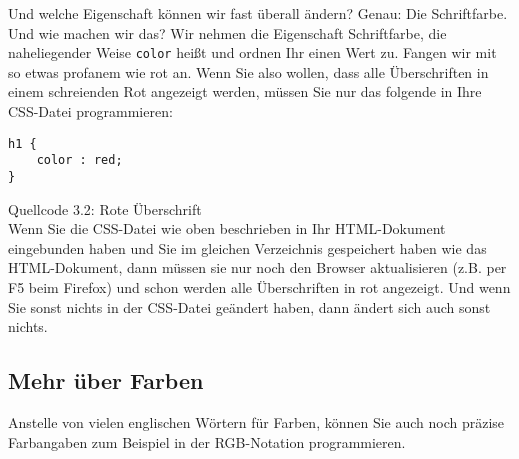 Und welche Eigenschaft können wir fast überall ändern? Genau: Die Schriftfarbe. Und wie machen wir das? Wir nehmen die Eigenschaft Schriftfarbe, die naheliegender Weise \verb|color| heißt und ordnen Ihr einen Wert zu. Fangen wir mit so etwas profanem wie rot an. Wenn Sie also wollen, dass alle Überschriften in einem schreienden Rot angezeigt werden, müssen Sie nur das folgende in Ihre CSS-Datei programmieren: 

\begin{verbatim}
h1 {
	color : red;
}
\end{verbatim}
Quellcode 3.2: Rote Überschrift\\

Wenn Sie die CSS-Datei wie oben beschrieben in Ihr HTML-Dokument eingebunden haben und Sie im gleichen Verzeichnis gespeichert haben wie das HTML-Dokument, dann müssen sie nur noch den Browser aktualisieren (z.B. per F5 beim Firefox) und schon werden alle Überschriften in rot angezeigt. Und wenn Sie sonst nichts in der CSS-Datei geändert haben, dann ändert sich auch sonst nichts.

\subsection{Mehr über Farben}

Anstelle von vielen englischen Wörtern für Farben, können Sie auch noch präzise Farbangaben zum Beispiel in der RGB-Notation programmieren.\\

